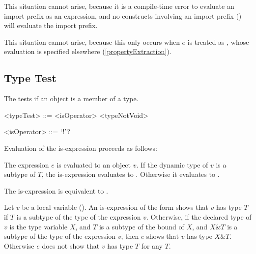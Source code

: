 \documentclass[makeidx]{article}
\begin{document}
{\LMHash{}%
This situation cannot arise,
because it is a compile-time error
to evaluate an import prefix as an expression,
and no constructs involving an import prefix
()
will evaluate the import prefix.
\EndCase

\LMHash{}%
This situation cannot arise,
because this only occurs when $e$ is treated as
,
whose evaluation is specified elsewhere
(\ref{propertyExtraction}).
\EndCase


\subsection{Type Test}

\LMHash{}%
The  tests if an object is a member of a type.

\begin{grammar}
<typeTest> ::= <isOperator> <typeNotVoid>

<isOperator> ::= \IS{} `!'?
\end{grammar}

\LMHash{}%
Evaluation of the is-expression  proceeds as follows:

\LMHash{}%
The expression $e$ is evaluated to an object $v$.
If the dynamic type of $v$ is a subtype of $T$,
the is-expression evaluates to \TRUE.
Otherwise it evaluates to \FALSE.


\LMHash{}%
The is-expression  is equivalent to
.

\LMHash{}%
Let $v$ be a local variable ().
An is-expression of the form 
shows that $v$ has type $T$
if $T$ is a subtype of the type of the expression $v$.
%
Otherwise,
if the declared type of $v$ is the type variable $X$,
and $T$ is a subtype of the bound of $X$,
and $X \& T$ is a subtype of the type of the expression $v$,
then $e$ shows that $v$ has type $X \& T$.
%
Otherwise $e$ does not show that $v$ has type $T$ for any $T$.

}
\end{document}
